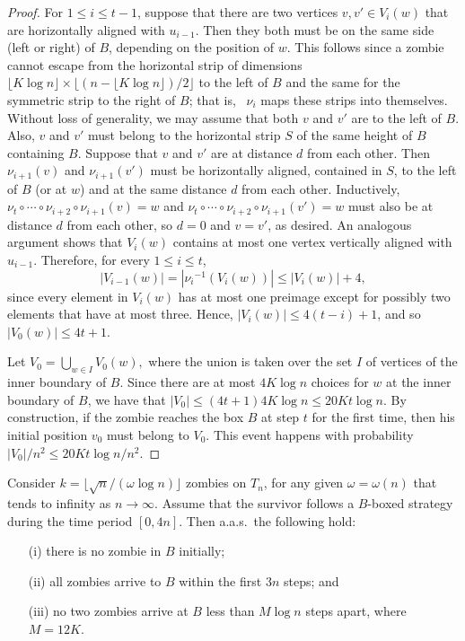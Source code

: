 \documentclass[12pt]{amsart}
\begin{document}
\begin{proof}
For $1\le i\le t-1$, suppose that there are two vertices $v,v'\in V_i(w)$ that are horizontally aligned with $u_{i-1}$. Then they both must be on the same side
(left or right) of $B$, depending on the position of $w$. This follows since a zombie cannot escape from the horizontal strip of dimensions $\lfloor K\log n\rfloor \times \lfloor (n-\lfloor K\log n\rfloor)/2 \rfloor$ to the left of $B$ and the same for the symmetric strip to the right of $B$; that is, ~$\nu_i$ maps these strips into themselves. Without loss of generality, we may assume that both $v$ and $v'$ are to the left of $B$. Also, $v$ and $v'$ must belong to the horizontal strip $S$ of
the same height of $B$ containing $B$. Suppose that $v$ and $v'$ are at distance $d$ from each other. Then $\nu_{i+1}(v)$ and $\nu_{i+1}(v')$ must be horizontally aligned, contained in $S$, to the
left of $B$ (or at $w$) and at the same distance $d$ from each other. Inductively, $\nu_t \circ \cdots \circ \nu_{i+2} \circ \nu_{i+1}(v) = w$ and $\nu_t \circ \cdots \circ \nu_{i+2} \circ
\nu_{i+1}(v') = w$ must also be at distance $d$ from each other, so $d=0$ and $v=v'$, as desired. An analogous argument shows that  $V_i(w)$ contains at most one vertex vertically aligned with
$u_{i-1}$. Therefore, for every $1\le i\le t$,
\[
|V_{i-1}(w)| = |{\nu_i}^{-1}(V_i(w))| \le |V_{i}(w)|+4,
\]
since every element in $V_i(w)$ has at most one preimage except for possibly two elements that have at most three. Hence,
$|V_{i}(w)| \le 4(t-i) +1$, and so $|V_{0}(w)| \le 4t+1$.

Let $V_0 = \bigcup_{w\in I} V_0(w),$ where the union is taken over the set $I$ of vertices of the inner boundary of $B$. Since there are at most $4K\log n$ choices for $w$ at the inner boundary of $B$, we have that $|V_0| \le (4t+1)4K\log n \le 20Kt\log n$. By construction, if the zombie
reaches the box $B$ at step $t$ for the first time, then his initial position $v_0$ must belong to $V_0$. This event happens with probability $|V_0|/n^2 \le 20Kt\log n/n^2$.
\end{proof}
\begin{lemma}\label{lem:usefultorus}
Consider $k= \lfloor \sqrt n/(\omega \log n) \rfloor$ zombies on $T_n$, for any given $\omega = \omega(n)$ that tends to infinity as $n\to \infty$. Assume that the survivor follows a $B$-boxed strategy during the time period $[0,4n]$. Then a.a.s.\ the
following hold:
\begin{enumerate}
\item[(i)]
there is no zombie in $B$ initially;
\item[(ii)]
all zombies arrive to $B$ within the first $3n$ steps; and
\item[(iii)]
no two zombies arrive at $B$ less than $M\log n$ steps apart, where $M=12K$.
\end{enumerate}
\end{lemma}
\end{document}
